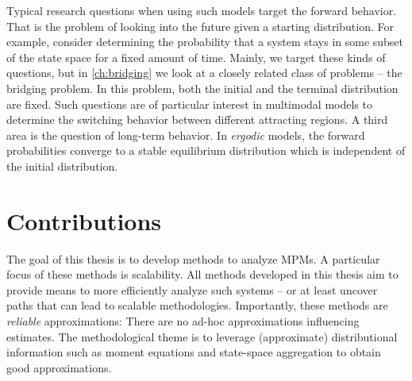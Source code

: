 Typical research questions when using such models target the forward behavior.
That is the problem of looking into the future given a starting distribution.
For example, consider determining the probability that a system stays in some subset of the state space for a fixed amount of time.
Mainly, we target these kinds of questions, but in \autoref{ch:bridging} we look at a closely related class of problems -- the bridging problem.
In this problem, both the initial and the terminal distribution are fixed.
Such questions are of particular interest in multimodal models to determine the switching behavior between different attracting regions.
A third area is the question of long-term behavior.
In \emph{ergodic} models, the forward probabilities converge to a stable equilibrium distribution which is independent of the initial distribution.

\section{Contributions}
The goal of this thesis is to develop methods to analyze \acp{MPM}.
A particular focus of these methods is scalability.
All methods developed in this thesis aim to provide means to more efficiently analyze such systems -- or at least uncover paths that can lead to scalable methodologies.
Importantly, these methods are \emph{reliable} approximations: There are no ad-hoc approximations influencing estimates.
The methodological theme is to leverage (approximate) distributional information such as moment equations and state-space aggregation to obtain good approximations.

